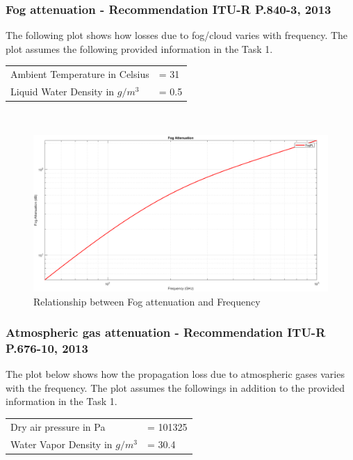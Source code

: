 \documentclass[a4paper,11pt]{article}%
\begin{document}
\subsubsection{Fog attenuation - Recommendation ITU-R P.840-3, 2013\cite{fog}}
The following plot shows how losses due to fog/cloud varies with frequency. The plot assumes the following provided information in the Task 1.\\

\begin{tabular}{l l}
	Ambient Temperature in Celsius&= 31\\
	Liquid Water Density in $g/m^3$&= 0.5\\
\end{tabular}\\

\begin{figure}[!h]
	\centering
	\includegraphics[scale=0.35]{figures/FogPL.png}
	\caption{Relationship between Fog attenuation  and Frequency}
\end{figure}

\subsubsection{Atmospheric gas attenuation - Recommendation ITU-R P.676-10, 2013\cite{gas}}

The plot below shows how the propagation loss due to atmospheric gases varies with the frequency. The plot assumes the followings in addition to the provided information in the Task 1.

\begin{tabular}{l l}
	 Dry air pressure in Pa&= 101325\\
	 Water Vapor Density in $g/m^3$&= 30.4\cite{vapor}\\
\end{tabular}
\end{document}

